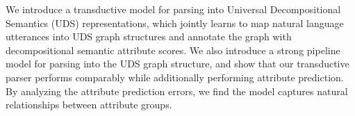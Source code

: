 We introduce a transductive model for parsing into Universal Decompositional Semantics (UDS) representations, which jointly learns to map natural language utterances into UDS graph structures and annotate the graph with decompositional semantic attribute scores. We also introduce a strong pipeline model for parsing into the UDS graph structure, and show that our transductive parser performs comparably while additionally performing attribute prediction. By analyzing the attribute prediction errors, we find the model captures natural relationships between attribute groups.
